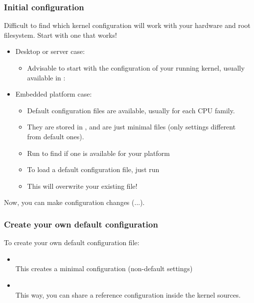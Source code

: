 \begin{frame}
  \frametitle{Initial configuration}
  Difficult to find which kernel configuration will work
  with your hardware and root filesystem. Start with one
  that works!
  \begin{itemize}
  \item Desktop or server case:
     \begin{itemize}
       \item Advisable to start with the configuration of your running
	  kernel, usually available in :\\
     \end{itemize}
  \item Embedded platform case:
     \begin{itemize}
  	\item Default configuration files are available, usually for
	  each CPU family.
        \item They are stored in , and are
          just minimal  files (only settings different
          from default ones).
        \item Run  to find if one is available for your
          platform
        \item To load a default configuration file, just run\\
        \item This will overwrite your existing  file!
     \end{itemize}
  \end{itemize}
  Now, you can make configuration changes (...).
\end{frame}

\begin{frame}
  \frametitle{Create your own default configuration}
  To create your own default configuration file:
  \begin{itemize}
     \item {}\\
       This creates a minimal configuration (non-default settings)
     \item {}\\
       This way, you can share a reference configuration inside
       the kernel sources. 
  \end{itemize}
\end{frame}

